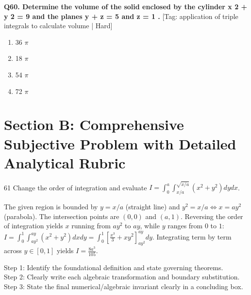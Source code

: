 \noindent\textbf{Q60. Determine the volume of the solid enclosed by the cylinder x 2 + y 2 = 9 and the planes y + z = 5 and z = 1 .} \hfill [Tag: application of triple integrals to calculate volume | Hard]
\begin{enumerate}[label=(\alph*),topsep=2pt,itemsep=1pt,partopsep=0pt,parsep=0pt]
    \item {{36 $\pi$}}
    \item {{18 $\pi$}}
    \item {{54 $\pi$}}
    \item {{72 $\pi$}}
\end{enumerate}
\vspace{2mm}


\section{Section B: Comprehensive Subjective Problem with Detailed Analytical Rubric}

\begin{subjectiveq}{6}{1}
Change the order of integration and evaluate $I = \int_0^a \int_{x/a}^{\sqrt{x/a}} (x^2 + y^2) dy dx$.
\end{subjectiveq}

\begin{solbox}
The given region is bounded by $y = x/a$ (straight line) and $y^2 = x/a \iff x = ay^2$ (parabola). The intersection points are $(0,0)$ and $(a,1)$. Reversing the order of integration yields $x$ running from $ay^2$ to $ay$, while $y$ ranges from $0$ to $1$: $I = \int_0^1 \int_{ay^2}^{ay} (x^2 + y^2) dx dy = \int_0^1 \left[ \frac{x^3}{3} + xy^2 \right]_{ay^2}^{ay} dy$. Integrating term by term across $y \in [0, 1]$ yields $I = \frac{8a^3}{105}$.
\end{solbox}

\begin{examinertip}
Step 1: Identify the foundational definition and state governing theorems.\\
Step 2: Clearly write each algebraic transformation and boundary substitution.\\
Step 3: State the final numerical/algebraic invariant clearly in a concluding box.
\end{examinertip}
